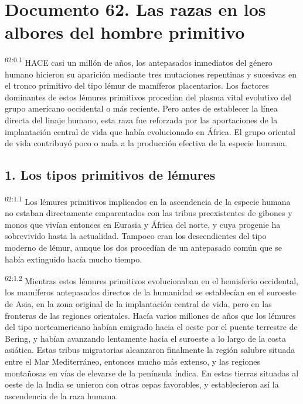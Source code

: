 \chapter{Documento 62. Las razas en los albores del hombre primitivo}
\par
\textsuperscript{62:0.1} HACE casi un millón de años, los antepasados inmediatos del género humano hicieron su aparición mediante tres mutaciones repentinas y sucesivas en el tronco primitivo del tipo lémur de mamíferos placentarios. Los factores dominantes de estos lémures primitivos procedían del plasma vital evolutivo del grupo americano occidental o más reciente. Pero antes de establecer la línea directa del linaje humano, esta raza fue reforzada por las aportaciones de la implantación central de vida que había evolucionado en África. El grupo oriental de vida contribuyó poco o nada a la producción efectiva de la especie humana.

\section*{1. Los tipos primitivos de lémures}
\par
\textsuperscript{62:1.1} Los lémures primitivos implicados en la ascendencia de la especie humana no estaban directamente emparentados con las tribus preexistentes de gibones y monos que vivían entonces en Eurasia y África del norte, y cuya progenie ha sobrevivido hasta la actualidad. Tampoco eran los descendientes del tipo moderno de lémur, aunque los dos procedían de un antepasado común que se había extinguido hacía mucho tiempo.

\par
\textsuperscript{62:1.2} Mientras estos lémures primitivos evolucionaban en el hemisferio occidental, los mamíferos antepasados directos de la humanidad se establecían en el suroeste de Asia, en la zona original de la implantación central de vida, pero en las fronteras de las regiones orientales. Hacía varios millones de años que los lémures del tipo norteamericano habían emigrado hacia el oeste por el puente terrestre de Bering, y habían avanzando lentamente hacia el suroeste a lo largo de la costa asiática. Estas tribus migratorias alcanzaron finalmente la región salubre situada entre el Mar Mediterráneo, entonces mucho más extenso, y las regiones montañosas en vías de elevarse de la península índica. En estas tierras situadas al oeste de la India se unieron con otras cepas favorables, y establecieron así la ascendencia de la raza humana.

